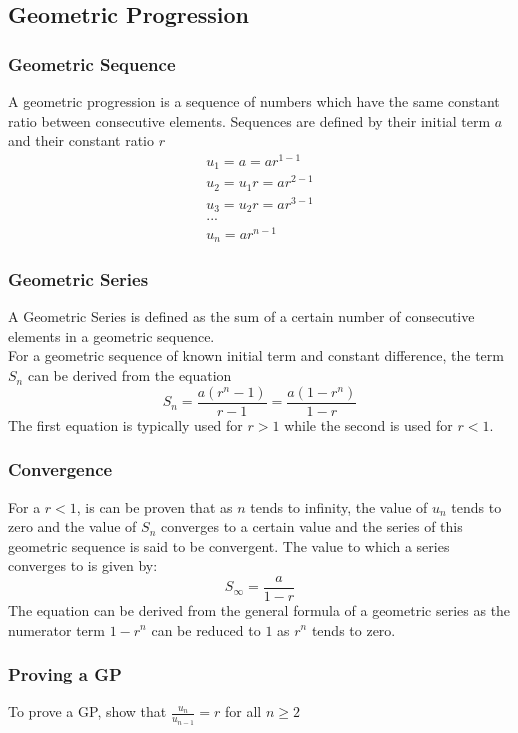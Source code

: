 \documentclass[../main]{subfiles}
\begin{document}
\subsection{Geometric Progression}
	
	\subsubsection{Geometric Sequence}
	A geometric progression is a sequence of numbers which have the same constant ratio between consecutive elements. Sequences are defined by their initial term \(a\) and their constant ratio \(r\)
	\begin{equation*} \begin{gathered}
		u_1 = a = ar^{1-1}\\
		u_2 = u_1r = ar^{2-1}\\
		u_3 = u_2r = ar^{3-1} \\
		...\\
		u_n = ar^{n-1}
	\end{gathered} \end{equation*} 
	\subsubsection{Geometric Series}
	A Geometric Series is defined as the sum of a certain number of consecutive elements in a geometric sequence. \\
	For a geometric sequence of known initial term and constant difference, the term \(S_n\) can be derived from the equation
	\[ S_n = \frac{a(r^n-1)}{r-1} = \frac{a(1-r^n)}{1-r} \]
	The first equation is typically used for \(r>1\) while the second is used for \(r<1\).
	\subsubsection{Convergence}
	For a \(r<1\), is can be proven that as \(n\) tends to infinity, the value of \(u_n\) tends to zero and the value of \(S_n\) converges to a certain value and the series of this geometric sequence is said to be convergent. The value to which a series converges to is given by:
	\[ S_{\infty} = \frac{a}{1-r} \]
	The equation can be derived from the general formula of a geometric series as the numerator term \(1-r^n\) can be reduced to \(1\) as \(r^n\) tends to zero.
	\subsubsection{Proving a GP}
	To prove a GP, show that \(\frac{u_n}{u_{n-1}} = r\) for all \(n\geq 2\)
\end{document}
